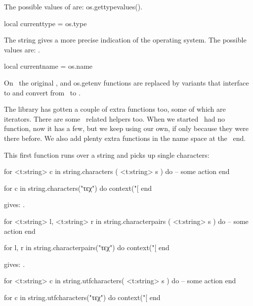 The possible values of  are: \showenginekeylist
{os.gettypevalues()}.

\starttyping[option=LUA]
local currenttype = os.type
\stoptyping

The  string gives a more precise indication of the operating
system. The possible values are: .

\starttyping[option=LUA]
local currentname = os.name
\stoptyping

On \MSWINDOWS\ the original ,  and \type
{os.getenv} functions are replaced by variants that interface to and convert from
\ to .

\stopsubsection

\startsubsection[title=Extra string helpers]

The  library has gotten a couple of extra functions too, some of
which are iterators. There are some \UNICODE\ related helpers too. When we
started \LUA\ had no  function, now it has a few, but we keep using our own,
if only because they were there before. We also add plenty extra functions in the
 name space at the \LUA\ end.

This first function runs over a string and picks up single characters:

\starttyping[option=LUA]
for <t:string> c in string.characters ( <t:string> s ) do
    -- some action
end
\stoptyping

\startbuffer
\startluacode
for c in string.characters("τεχ") do
    context("[%
end
\stopluacode
\stopbuffer

\typebuffer

gives: \inlinebuffer.

\starttyping[option=LUA]
for <t:string> l, <t:string> r in string.characterpairs ( <t:string> s ) do
    -- some action
end
\stoptyping

\startbuffer
\startluacode
for l, r in string.characterpairs("τεχ") do
    context("[%
end
\stopluacode
\stopbuffer

\typebuffer

gives: \inlinebuffer.

\starttyping[option=LUA]
for <t:string> c in string.utfcharacters( <t:string> s ) do
    -- some action
end
\stoptyping

\startbuffer
\startluacode
for c in string.utfcharacters("τεχ") do
    context("[%
end
\stopluacode
\stopbuffer

